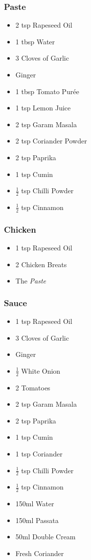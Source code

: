 \documentclass[11pt, english]{article}
\begin{document}
		\subsubsection*{Paste}

	\begin{itemize}
        \setlength\itemsep{0cm}
                \item 2 tsp Rapeseed Oil
		\item 1 tbsp Water
		\item 3 Cloves of Garlic
		\item Ginger
		\item 1 tbsp Tomato Pur\'{e}e
		\item 1 tsp Lemon Juice
		\item 2 tsp Garam Masala
		\item 2 tsp Coriander Powder
		\item 2 tsp Paprika
		\item 1 tsp Cumin
		\item $\frac{1}{2}$ tsp Chilli Powder
		\item $\frac{1}{2}$ tsp Cinnamon
        \end{itemize}

		\subsubsection*{Chicken}

	\begin{itemize}
        \setlength\itemsep{0cm}
                \item 1 tsp Rapeseed Oil
		\item 2 Chicken Breats
		\item The \textit{Paste}
        \end{itemize}

		\subsubsection*{Sauce}

	\begin{itemize}
        \setlength\itemsep{0cm}
                \item 1 tsp Rapeseed Oil
		\item 3 Cloves of Garlic
		\item Ginger
		\item $\frac{1}{2}$ White Onion
		\item 2 Tomatoes
		\item 2 tsp Garam Masala
		\item 2 tsp Paprika
		\item 1 tsp Cumin
		\item 1 tsp Coriander
		\item $\frac{1}{2}$ tsp Chilli Powder
		\item $\frac{1}{2}$ tsp Cinnamon
		\item 150ml Water
		\item 150ml Passata
		\item 50ml Double Cream
		\item Fresh Coriander
        \end{itemize}
\end{document}
